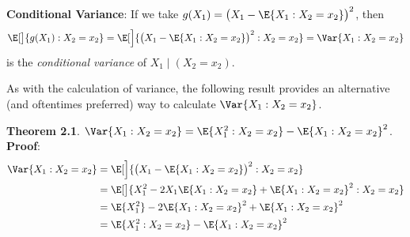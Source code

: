 \begin{Regular}
    \textbf{Conditional Variance}: If we take $ g(X_1)=\bigl(X_1-\E{X_1\given X_2=x_2}\bigr)^2 $, then
    \[ \E[\big]{g(X_1)\given X_2=x_2}=\E[\Big]{\bigl(X_1-\E{X_1\given X_2=x_2}\bigr)^2\given X_2=x_2}=\Var{X_1\given X_2=x_2} \]
    is the \emph{conditional variance} of $ X_1\mid (X_2=x_2) $.
\end{Regular}
As with the calculation of variance, the following result provides an alternative (and oftentimes
preferred) way to calculate $ \Var{X_1\given X_2=x_2} $.
\begin{Result}
    \textbf{Theorem 2.1}. $ \Var{X_1\given X_2=x_2}=\E{X_1^2\given X_2=x_2}-\E{X_1\given X_2=x_2}^2 $.
    \tcblower{}
    \textbf{Proof}:
    \begin{align*}
        \Var{X_1\given X_2=x_2}
         & =\E[\Big]{\bigl(X_1-\E{X_1\given X_2=x_2}\bigr)^2\given X_2=x_2}                 \\
         & =\E[\big]{X_1^2-2X_1\E{X_1\given X_2=x_2}+\E{X_1\given X_2=x_2}^2\given X_2=x_2} \\
         & =\E{X_1^2}-2\E{X_1\given X_2=x_2}^2+\E{X_1\given X_2=x_2}^2                      \\
         & =\E{X_1^2\given X_2=x_2}-\E{X_1\given X_2=x_2}^2
    \end{align*}
\end{Result}
